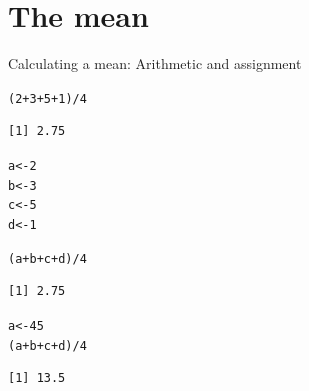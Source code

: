 \documentclass[10pt]{beamer}\usepackage[]{graphicx}\usepackage[]{color}
\makeatletter
\newcommand{\hlnum}[1]{\textcolor[rgb]{0.686,0.059,0.569}{#1}}%
\newcommand{\hlopt}[1]{\textcolor[rgb]{0,0,0}{#1}}%
\newcommand{\hlstd}[1]{\textcolor[rgb]{0.345,0.345,0.345}{#1}}%
\newcommand{\hlkwb}[1]{\textcolor[rgb]{0.69,0.353,0.396}{#1}}%
\newenvironment{kframe}{%
 \def\at@end@of@kframe{}%
 \ifinner\ifhmode%
  \def\at@end@of@kframe{\end{minipage}}%
  \begin{minipage}{\columnwidth}%
 \fi\fi%
 \def\FrameCommand##1{\hskip\@totalleftmargin \hskip-\fboxsep
 \colorbox{shadecolor}{##1}\hskip-\fboxsep
     \hskip-\linewidth \hskip-\@totalleftmargin \hskip\columnwidth}%
 \MakeFramed {\advance\hsize-\width
   \@totalleftmargin\z@ \linewidth\hsize
   \@setminipage}}%
 {\par\unskip\endMakeFramed%
 \at@end@of@kframe}
\newenvironment{knitrout}{}{} %
\makeatother
\begin{document}
\section{The mean}

\begin{frame}[fragile]{Calculating a mean: Arithmetic and assignment}

\begin{knitrout}
\color{fgcolor}\begin{kframe}
\begin{alltt}
  \hlstd{(}\hlnum{2} \hlopt{+} \hlnum{3} \hlopt{+} \hlnum{5} \hlopt{+} \hlnum{1}\hlstd{)} \hlopt{/} \hlnum{4}
\end{alltt}
\begin{verbatim}
[1] 2.75
\end{verbatim}
\end{kframe}
\end{knitrout}
\pause
\begin{knitrout}
\color{fgcolor}\begin{kframe}
\begin{alltt}
  \hlstd{a} \hlkwb{<-} \hlnum{2}
  \hlstd{b} \hlkwb{<-} \hlnum{3}
  \hlstd{c} \hlkwb{<-} \hlnum{5}
  \hlstd{d} \hlkwb{<-} \hlnum{1}

  \hlstd{(a} \hlopt{+} \hlstd{b} \hlopt{+} \hlstd{c} \hlopt{+} \hlstd{d)} \hlopt{/} \hlnum{4}
\end{alltt}
\begin{verbatim}
[1] 2.75
\end{verbatim}
\end{kframe}
\end{knitrout}
\pause
\begin{knitrout}
\color{fgcolor}\begin{kframe}
\begin{alltt}
  \hlstd{a} \hlkwb{<-} \hlnum{45}
  \hlstd{(a} \hlopt{+} \hlstd{b} \hlopt{+} \hlstd{c} \hlopt{+} \hlstd{d)} \hlopt{/} \hlnum{4}
\end{alltt}
\begin{verbatim}
[1] 13.5
\end{verbatim}
\end{kframe}
\end{knitrout}
\end{frame}
\end{document}
